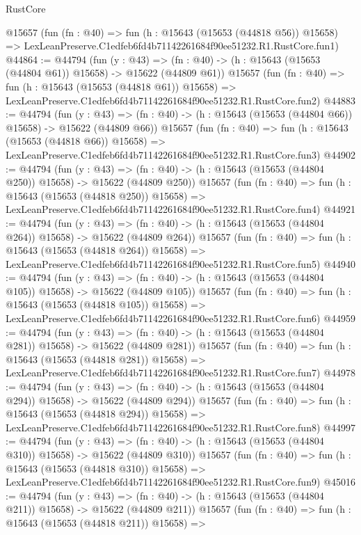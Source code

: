 \begin{lexlean}{RustCore}
\begin{coremodule}
    @15657
    (fun (fn : @40) =>
    fun (h : @15643 (@15653 (@44818 @56)) @15658) =>
    LexLeanPreserve.C1edfeb6fd4b71142261684f90ee51232.R1.RustCore.fun1)
@44864 := @44794
    (fun (y : @43) =>
    (fn : @40) -> (h : @15643 (@15653 (@44804 @61)) @15658) -> @15622 (@44809 @61))
    @15657
    (fun (fn : @40) =>
    fun (h : @15643 (@15653 (@44818 @61)) @15658) =>
    LexLeanPreserve.C1edfeb6fd4b71142261684f90ee51232.R1.RustCore.fun2)
@44883 := @44794
    (fun (y : @43) =>
    (fn : @40) -> (h : @15643 (@15653 (@44804 @66)) @15658) -> @15622 (@44809 @66))
    @15657
    (fun (fn : @40) =>
    fun (h : @15643 (@15653 (@44818 @66)) @15658) =>
    LexLeanPreserve.C1edfeb6fd4b71142261684f90ee51232.R1.RustCore.fun3)
@44902 := @44794
    (fun (y : @43) =>
    (fn : @40) -> (h : @15643 (@15653 (@44804 @250)) @15658) -> @15622 (@44809 @250))
    @15657
    (fun (fn : @40) =>
    fun (h : @15643 (@15653 (@44818 @250)) @15658) =>
    LexLeanPreserve.C1edfeb6fd4b71142261684f90ee51232.R1.RustCore.fun4)
@44921 := @44794
    (fun (y : @43) =>
    (fn : @40) -> (h : @15643 (@15653 (@44804 @264)) @15658) -> @15622 (@44809 @264))
    @15657
    (fun (fn : @40) =>
    fun (h : @15643 (@15653 (@44818 @264)) @15658) =>
    LexLeanPreserve.C1edfeb6fd4b71142261684f90ee51232.R1.RustCore.fun5)
@44940 := @44794
    (fun (y : @43) =>
    (fn : @40) -> (h : @15643 (@15653 (@44804 @105)) @15658) -> @15622 (@44809 @105))
    @15657
    (fun (fn : @40) =>
    fun (h : @15643 (@15653 (@44818 @105)) @15658) =>
    LexLeanPreserve.C1edfeb6fd4b71142261684f90ee51232.R1.RustCore.fun6)
@44959 := @44794
    (fun (y : @43) =>
    (fn : @40) -> (h : @15643 (@15653 (@44804 @281)) @15658) -> @15622 (@44809 @281))
    @15657
    (fun (fn : @40) =>
    fun (h : @15643 (@15653 (@44818 @281)) @15658) =>
    LexLeanPreserve.C1edfeb6fd4b71142261684f90ee51232.R1.RustCore.fun7)
@44978 := @44794
    (fun (y : @43) =>
    (fn : @40) -> (h : @15643 (@15653 (@44804 @294)) @15658) -> @15622 (@44809 @294))
    @15657
    (fun (fn : @40) =>
    fun (h : @15643 (@15653 (@44818 @294)) @15658) =>
    LexLeanPreserve.C1edfeb6fd4b71142261684f90ee51232.R1.RustCore.fun8)
@44997 := @44794
    (fun (y : @43) =>
    (fn : @40) -> (h : @15643 (@15653 (@44804 @310)) @15658) -> @15622 (@44809 @310))
    @15657
    (fun (fn : @40) =>
    fun (h : @15643 (@15653 (@44818 @310)) @15658) =>
    LexLeanPreserve.C1edfeb6fd4b71142261684f90ee51232.R1.RustCore.fun9)
@45016 := @44794
    (fun (y : @43) =>
    (fn : @40) -> (h : @15643 (@15653 (@44804 @211)) @15658) -> @15622 (@44809 @211))
    @15657
    (fun (fn : @40) =>
    fun (h : @15643 (@15653 (@44818 @211)) @15658) =>

\end{coremodule}
\end{lexlean}
